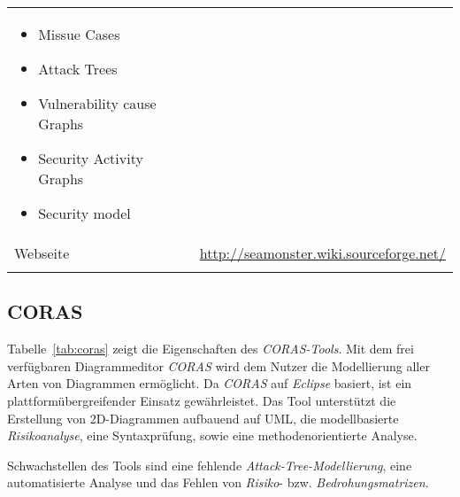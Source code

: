 \begin{table}[h!tbp]
\begin{tabularx}{\textwidth}{ l !{\color{white}\vrule}  X }
\begin{itemize}
										\item Missue Cases 
										\item Attack Trees 
										\item Vulnerability cause Graphs 
										\item Security Activity Graphs 
										\item Security model 
									\end{itemize}\\
\hline
{} Webseite		&		\url{http://seamonster.wiki.sourceforge.net/} \\
\hline
\end{tabularx}
\end{table}

\pagebreak
\subsection{CORAS}
Tabelle~\ref{tab:coras} zeigt die Eigenschaften des \textit{CORAS-Tools}.
Mit dem frei verfügbaren Diagrammeditor \textit{CORAS} wird dem Nutzer die Modellierung aller Arten von Diagrammen ermöglicht. Da \textit{CORAS} auf \textit{Eclipse} basiert, ist ein plattformübergreifender Einsatz gewährleistet.  Das Tool unterstützt die Erstellung von 2D-Diagrammen aufbauend auf UML, die modellbasierte \textit{Risikoanalyse}, eine Syntaxprüfung, sowie eine methodenorientierte Analyse.

Schwachstellen des Tools sind eine fehlende \textit{Attack-Tree-Modellierung}, eine automatisierte Analyse und das Fehlen von \textit{Risiko}- bzw. \textit{Bedrohungsmatrizen}.


